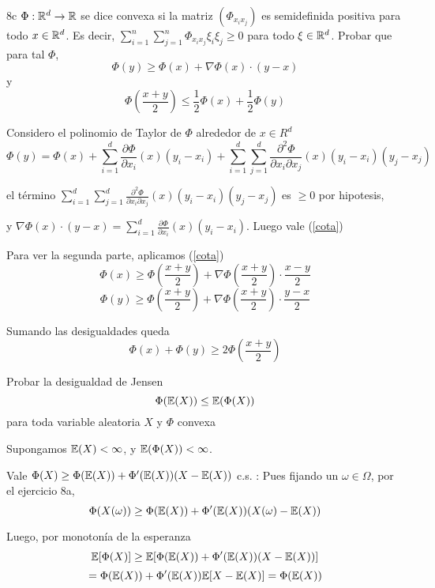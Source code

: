 \documentclass[11pt,a4paper]{article}
\begin{document}
\begin{ejercicio}{8c}{
	$\Phi: \mathbb R^d \to \mathbb R$	se dice convexa si la matriz $(\Phi_{x_i x_j})$ es semidefinida positiva para todo $x \in \mathbb R^d$.
	Es decir, $\sum_{i=1}^n \sum_{j=1}^n \Phi_{x_i x_j} \xi_i \xi_j \ge 0$ para todo $\xi \in \mathbb R^d$.
	Probar que para tal $\Phi$,
	\begin{equation}
	\label{cota}
		\Phi(y) \ge \Phi(x) + \nabla\Phi(x) \cdot (y-x)
	\end{equation}
	y
	$$
		\Phi(\frac{x+y}{2}) \le \frac{1}{2}\Phi(x) + \frac{1}{2}\Phi(y)
	$$
}{
	Considero el polinomio de Taylor de $\Phi$ alrededor de $x \in R^d$
	$$
		\Phi(y) = \Phi(x)
		+ \sum_{i=1}^d \frac {\partial \Phi}{\partial x_i}(x) (y_i - x_i)
		+ \sum_{i=1}^d \sum_{j=1}^d \frac{\partial^2 \Phi}{\partial x_i \partial x_j}(x) (y_i - x_i) (y_j - x_j)
	$$

	el t\'ermino $\sum_{i=1}^d \sum_{j=1}^d \frac{\partial^2 \Phi}{\partial x_i \partial x_j}(x) (y_i - x_i) (y_j - x_j)$ es $\ge 0$ por hipotesis,

	y $\nabla\Phi(x) \cdot (y-x) = \sum_{i=1}^d \frac {\partial \Phi}{\partial x_i}(x) (y_i - x_i)$.
	Luego vale (\ref{cota})

	Para ver la segunda parte, aplicamos (\ref{cota})
	$$
		\Phi(x) \ge \Phi\left(\frac{x+y}{2}\right) + \nabla\Phi\left(\frac{x+y}{2}\right) \cdot \frac{x-y}{2}
	$$
	$$
		\Phi(y) \ge \Phi\left(\frac{x+y}{2}\right) + \nabla\Phi\left(\frac{x+y}{2}\right) \cdot \frac{y-x}{2}
	$$

	Sumando las desigualdades queda
	$$
		\Phi(x) + \Phi(y) \ge 2 \Phi\left(\frac{x+y}{2}\right)
	$$
}
\end{ejercicio}

\begin{ejercicio}{9}{
	Probar la desigualdad de Jensen
	$$
		\Phi(\mathbb E(X)) \le \mathbb E(\Phi(X))
	$$
	para toda variable aleatoria $X$ y $\Phi$ convexa
}{
	Supongamos $\mathbb E(X) < \infty$, y $\mathbb E (\Phi(X)) < \infty$.

		Vale $ \Phi(X) \ge \Phi(\mathbb E(X)) + \Phi'(\mathbb E(X))(X - \mathbb E(X)) $ c.s. :
		Pues fijando un $\omega \in \Omega$, por el ejercicio 8a,
		$$
			\Phi(X(\omega))
			\ge
			\Phi(\mathbb E(X)) + \Phi'(\mathbb E(X)) (X(\omega) - \mathbb E(X))
		$$

		Luego, por monotonía de la esperanza
		$$
			\mathbb E[\Phi(X)]
			\ge
			\mathbb E[\Phi(\mathbb E(X)) + \Phi'(\mathbb E(X)) (X - \mathbb E(X))]
			$$$$
			=
			\Phi(\mathbb E(X)) + \Phi'(\mathbb E(X)) \mathbb E[X - \mathbb E(X)]
			=
			\Phi(\mathbb E(X))
		$$
}\end{ejercicio}
\end{document}
